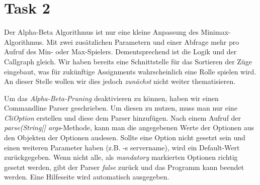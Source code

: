 \section{Task 2}
Der Alpha-Beta Algorithmus ist nur eine kleine Anpassung des Minimax-Algorithmus. Mit zwei zusätzlichen Parametern und einer Abfrage mehr pro Aufruf des Min- oder Max-Spielers. Dementsprechend ist die Logik und der Callgraph gleich. Wir haben bereits eine Schnittstelle für das Sortieren der Züge eingebaut, was für zukünftige Assignments wahrscheinlich eine Rolle spielen wird. An dieser Stelle wollen wir dies jedoch \textit{zunächst} nicht weiter thematisieren.

Um das \textit{Alpha-Beta-Pruning} deaktivieren zu können, haben wir einen Commandline Parser geschrieben. Um diesen zu nutzen, muss man nur eine \textit{CliOption} erstellen und diese dem Parser hinzufügen. Nach einem Aufruf der \textit{parse(String[] args}-Methode, kann man die angegebenen Werte der Optionen aus den Objekten der Optionen auslesen. Sollte eine Option nicht gesetzt sein und einen weiteren Parameter haben (z.B. -s servername), wird ein Default-Wert zurückgegeben. Wenn nicht alle, als \textit{mandatory} markierten Optionen richtig gesetzt werden, gibt der Parser \textit{false} zurück und das Programm kann beendet werden. Eine Hilfeseite wird automatisch ausgegeben.